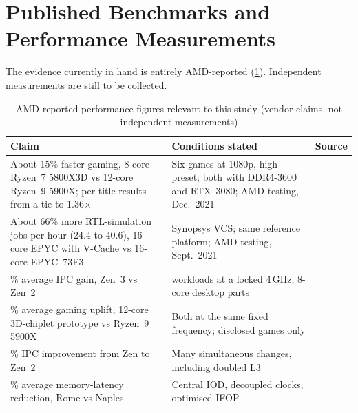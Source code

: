 
\section{Published Benchmarks and Performance Measurements}
\label{sec:benchmarks}

The evidence currently in hand is entirely AMD-reported (\cref{tab:amd-reported}). Independent measurements are still to be collected.

\begin{table}[htbp]
  \centering
  \caption{AMD-reported performance figures relevant to this study (vendor claims, not independent measurements)}
  \label{tab:amd-reported}
  \small
  \begin{tabularx}{\textwidth}{@{}>{\raggedright\arraybackslash}X>{\raggedright\arraybackslash}p{4.4cm}>{\raggedright\arraybackslash}p{2.0cm}@{}}
    \toprule
    \textbf{Claim} & \textbf{Conditions stated} & \textbf{Source} \\
    \midrule
    About 15\% faster gaming, 8-core Ryzen~7 5800X3D vs 12-core Ryzen~9 5900X; per-title results from a tie to 1.36$\times$ & Six games at 1080p, high preset; both with DDR4-3600 and RTX~3080; AMD testing, Dec.\ 2021 & \cite[slides~29, 35]{wuu2022vcache} \\
    About 66\% more RTL-simulation jobs per hour (24.4 to 40.6), 16-core EPYC with V-Cache vs 16-core EPYC~73F3 & Synopsys VCS; same reference platform; AMD testing, Sept.\ 2021 & \cite[slides~31, 35]{wuu2022vcache} \\
    19\% average IPC gain, Zen~3 vs Zen~2 & 25 workloads at a locked 4\,GHz, 8-core desktop parts & \cite[slides~10, 35]{wuu2022vcache} \\
    15\% average gaming uplift, 12-core 3D-chiplet prototype vs Ryzen~9 5900X & Both at the same fixed frequency; disclosed games only & \cite{swaminathanAdvancedPackagingEnabling2021} \\
    15\% IPC improvement from Zen to Zen~2 & Many simultaneous changes, including doubled L3 & \cite{suggs2019zen2} \\
    19\% average memory-latency reduction, Rome vs Naples & Central IOD, decoupled clocks, optimised IFOP & \cite{naffziger2020chiplet} \\
    \bottomrule
  \end{tabularx}
\end{table}

